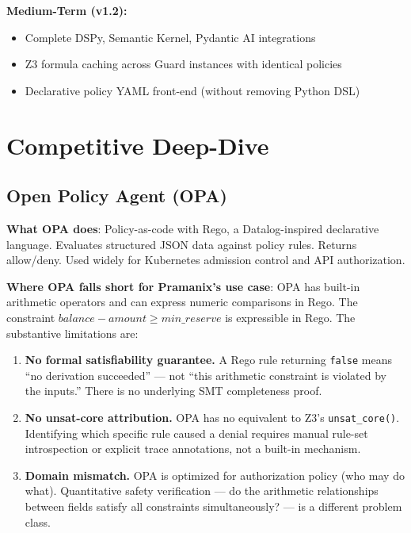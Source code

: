 \documentclass[12pt,a4paper,oneside]{report}
\newcommand{\code}[1]{\texttt{#1}}           %
\begin{document}
\textbf{Medium-Term (v1.2):}
\begin{itemize}
  \item Complete DSPy, Semantic Kernel, Pydantic AI integrations
  \item Z3 formula caching across Guard instances with identical policies
  \item Declarative policy YAML front-end (without removing Python DSL)
\end{itemize}

\chapter{Competitive Deep-Dive}

\section{Open Policy Agent (OPA)}

\textbf{What OPA does}: Policy-as-code with Rego, a Datalog-inspired
declarative language. Evaluates structured JSON data against policy rules.
Returns allow/deny. Used widely for Kubernetes admission control and API
authorization.

\textbf{Where OPA falls short for Pramanix's use case}: OPA has built-in
arithmetic operators and can express numeric comparisons in Rego.  The
constraint $\mathit{balance} - \mathit{amount} \geq \mathit{min\_reserve}$
is expressible in Rego.  The substantive limitations are:
\begin{enumerate}
  \item \textbf{No formal satisfiability guarantee.}  A Rego rule returning
        \code{false} means ``no derivation succeeded'' --- not ``this
        arithmetic constraint is violated by the inputs.''  There is no
        underlying SMT completeness proof.
  \item \textbf{No unsat-core attribution.}  OPA has no equivalent to Z3's
        \code{unsat\_core()}.  Identifying which specific rule caused a
        denial requires manual rule-set introspection or explicit trace
        annotations, not a built-in mechanism.
  \item \textbf{Domain mismatch.}  OPA is optimized for authorization policy
        (who may do what).  Quantitative safety verification --- do the
        arithmetic relationships between fields satisfy all constraints
        simultaneously? --- is a different problem class.
\end{enumerate}
\end{document}

